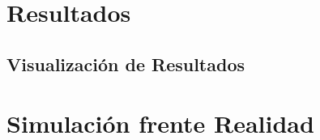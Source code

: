 \section*{Resultados}
\subsection*{Visualización de Resultados}
\section*{Simulación frente Realidad}

